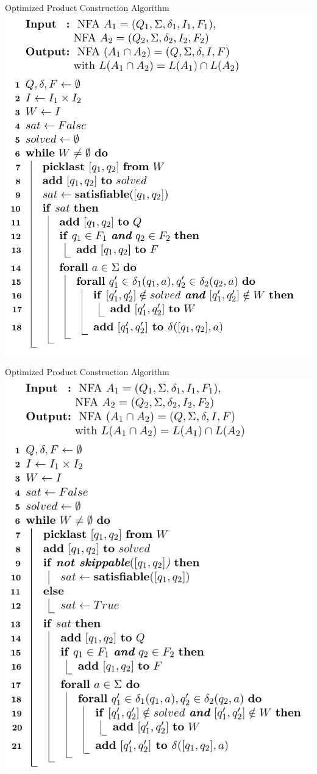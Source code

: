 \begin{frame}{Optimized Product Construction Algorithm}
    \center\includegraphics[scale=0.35]{img/algorithm_optimized_product_construction.png}
\end{frame}

\begin{frame}{Optimized Product Construction Algorithm}
    \center\includegraphics[scale=0.36]{img/algorithm_optimized_product_construction_with_skipping_sat_states.png}
\end{frame}